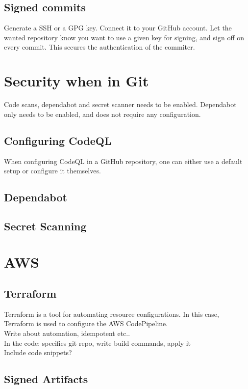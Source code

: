 \subsection{Signed commits}
Generate a SSH or a GPG key. Connect it to your GitHub account. Let the wanted repository know you want to use a given key for signing, and sign off on every commit. This secures the authentication of the commiter. 

\section{Security when in Git}
Code scans, dependabot and secret scanner needs to be enabled. Dependabot only needs to be enabled, and does not require any configuration. 

\subsection{Configuring CodeQL}
When configuring CodeQL in a GitHub repository, one can either use a default setup or configure it themselves. 

\subsection{Dependabot}

\subsection{Secret Scanning}


\section{AWS}
\subsection{Terraform}
Terraform is a tool for automating resource configurations. In this case, Terraform is used to configure the AWS CodePipeline. \\
Write about automation, idempotent etc.. \\
In the code: specifies git repo, write build commands, apply it \\
Include code snippets?

\subsection{Signed Artifacts}


